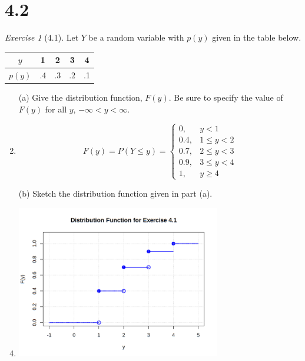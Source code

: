 \documentclass[12pt]{amsart}
\makeatletter
\theoremstyle{remark}
\newtheorem*{exercise}{Exercise}%
\renewenvironment{proof}[1][\proofname]{\par\doublespacing
  \pushQED{\qed}%
  \normalfont \topsep6\p@\@plus6\p@\relax
  \list{}{%
    \settowidth{\leftmargin}{\itshape\proofname:\hskip\labelsep}%
    \setlength{\labelwidth}{0pt}%
    \setlength{\itemindent}{-\leftmargin}%
  }%
  \item[\hskip\labelsep\itshape#1\@addpunct{:}]\ignorespaces
}{%
  \popQED\endlist\@endpefalse
  \singlespacing
}
\theoremstyle{mycomment}
\makeatother
\begin{document}
\thispagestyle{fancy}
\section*{4.2}

\begin{exercise}[4.1]
Let $Y$ be a random variable with $p(y)$ given in the table below.
\begin{center}
\begin{tabular}{c|cccc}
$y$ & 1 & 2 & 3 & 4 \\
\hline
$p(y)$ & .4 & .3 & .2 & .1
\end{tabular}
\end{center}

\begin{enumerate}
    \item[(a)] Give the distribution function, $F(y)$. Be sure to specify the value of $F(y)$ for all $y$, $-\infty < y < \infty$.
\begin{proof}[Solution]
 $$F(y) = P(Y \leq y) = \begin{cases}
	0, & y < 1 \\
	0.4, & 1 \leq y < 2 \\
	0.7, & 2 \leq y < 3 \\
	0.9, & 3 \leq y < 4 \\
	1, & y \geq 4
	\end{cases}$$
\end{proof}
    \item[(b)] Sketch the distribution function given in part (a).
\begin{proof}[Solution]
 	\includegraphics[width=0.7\textwidth]{exercise_4_1b.png}
\end{proof}
\end{enumerate} 
\end{exercise}
\end{document}
